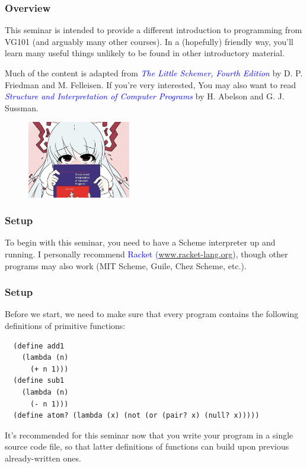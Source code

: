 \documentclass[xcolor=pdftex,dvipsnames,table]{beamer}
\begin{document}
\begin{frame}
\begin{columns}
\begin{column}{0.5\textwidth}
\begin{center}
\begin{figure}
        \end{figure}
      \end{center}
    \end{column}
  \end{columns}
\end{frame}
\begin{frame}[fragile]
  \frametitle{Overview}
  This seminar is intended to provide a different introduction to programming from VG101 (and arguably many other courses).
  In a (hopefully) friendly way, you'll learn many useful things unlikely to be found in other introductory material.
  \pause

  Much of the content is adapted from \textcolor{Blue}{\textit{The Little Schemer, Fourth Edition}} by D. P. Friedman and M. Felleisen.
  If you're very interested, You may also want to read \textcolor{Blue}{\textit{Structure and Interpretation of Computer Programs}} by H. Abelson and G. J. Sussman.
  \begin{center}
    \begin{figure}
      \includegraphics[width=0.4\textwidth]{SICP.png}
    \end{figure}
  \end{center}
\end{frame}
\begin{frame}
  \frametitle{Setup}
  To begin with this seminar, you need to have a Scheme interpreter up and running.
  I personally recommend \textcolor{Blue}{Racket (\url{www.racket-lang.org})}, though other programs may also work (MIT Scheme, Guile, Chez Scheme, etc.).
\end{frame}
\begin{frame}[fragile]
  \frametitle{Setup}
  Before we start, we need to make sure that every program contains the following definitions of primitive functions:
  \begin{verbatim}
  (define add1
    (lambda (n)
      (+ n 1)))
  (define sub1
    (lambda (n)
      (- n 1)))
  (define atom? (lambda (x) (not (or (pair? x) (null? x)))))
  \end{verbatim}
  It's recommended for this seminar now that you write your program in a single source code file, so that latter definitions of functions can build upon previous already-written ones.
\end{frame}
\end{document}
